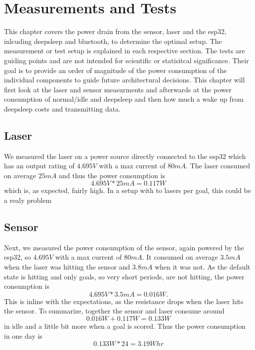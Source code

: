 \section{Measurements and Tests}
This chapter covers the power drain from the sensor, laser and the esp32, inlcuding deepsleep and bluetooth, to determine the optimal setup. The measurement or test setup is explained in each respective section. The tests are guiding points and are not intended for scientific or statisitcal significance. Their goal is to provide an order of magnitude of the power consumption of the individual components to guide future architectural decisions. This chapter will first look at the laser and sensor measurments and afterwards at the power consumption of normal/idle and deepsleep and then how much a wake up from deepsleep costs and transmitting data.


\subsection{Laser}
We measured the laser on a power source directly connected to the esp32 which has an output rating of $4.695V$ with a max current of $80mA$. The laser consumed on average $25mA$ and thus the power consumption is
\begin{equation*}
    4.695V * 25mA = 0.117W
\end{equation*}
which is, as expected, fairly high. In a setup with to lasers per goal, this could be a realy problem


\subsection{Sensor}
Next, we measured the power consumption of the sensor, again powered by the esp32, so $4.695V$ with a max current of $80mA$. It consumed on average $3.5mA$ when the laser was hitting the sensor and $3.8mA$ when it was not. As the default state is hitting and only goals, so very short periods, are not hitting, the power consumption is
  \begin{equation*}
      4.695V * 3.5mA = 0.016W.
    \end{equation*}
This is inline with the expectations, as the resistance drops when the laser hits the sensor. 
To summarize, together the sensor and laser consume around  
\begin{equation*}
    0.016W + 0.117W = 0.133W
  \end{equation*}
in idle and a little bit more when a goal is scored. Thus the power consumption in one day is
\begin{equation*}
    0.133W * 24 = 3.19Whr
\end{equation*}


